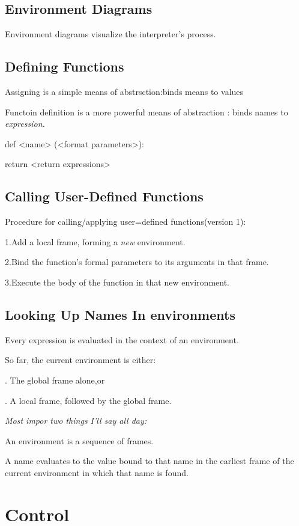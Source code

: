\documentclass{article}
\begin{document}
\subsection{Environment Diagrams}
Environment diagrams visualize the interpreter's process.\par
\subsection{Defining Functions}
Assigning is a simple means of abstrsction:binds means to values\par
Functoin definition is a more powerful means of abstraction : binds names to \emph{expression.}\par
def <name> (<format parameters>):\par
	return <return expressions>\par
	
\subsection{Calling User-Defined Functions}
Procedure for calling/applying user=defined functions(version 1):\par
1.Add a local frame, forming a \emph{new} environment. \par
2.Bind the function's formal parameters to its arguments in that frame.\par
3.Execute the body of the function in that new environment.\par
\subsection{Looking Up Names In environments}
Every expression is evaluated in the context of an environment.\par
So far, the current environment is either:\par
. The global frame alone,or\par
. A local frame, followed by the global frame.\par
\emph{Most impor two things I'll say all day:}\par
An environment is a sequence of frames.\par

A name evaluates to the value bound to that name in the earliest frame of the current environment in which that name is found.\par
\newpage
\section{Control}
\end{document}

